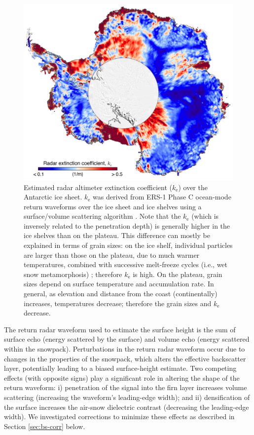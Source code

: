 \begin{figure}[!ht]
  \centering
  \includegraphics[width=.85\textwidth]{img/extinction_coef_v3d.png}
  \caption[Estimated radar altimeter extintion coefficient]{
  Estimated radar altimeter extinction coefficient ($k_\text{e}$) over the Antarctic ice sheet. $k_\text{e}$ was derived from ERS-1 Phase C ocean-mode return waveforms over the ice sheet and ice shelves using a surface/volume scattering algorithm \parencite{Davis1993}. Note that the $k_\text{e}$  (which is inversely related to the penetration depth) is generally higher in the ice shelves than on the plateau. This difference can mostly be explained in terms of grain sizes: on the ice shelf, individual particles are larger than those on the plateau, due to much warmer temperatures, combined with successive melt-freeze cycles (i.e., wet snow metamorphosis) \parencite{Zwally1994}; therefore $k_\text{e}$ is high. On the plateau, grain sizes depend on surface temperature and accumulation rate. In general, as elevation and distance from the coast (continentally) increases, temperatures decrease; therefore the grain sizes and $k_\text{e}$ decrease.
  }
  \label{c2f4}
\end{figure}


The return radar waveform used to estimate the surface height is the sum of surface echo (energy scattered by the surface) and volume echo (energy scattered within the snowpack). Perturbations in the return radar waveform occur due to changes in the properties of the snowpack, which alters the effective backscatter layer, potentially leading to a biased surface-height estimate. Two competing effects (with opposite signs) play a significant role in altering the shape of the return waveform: i) penetration of the signal into the firn layer increases volume scattering (increasing the waveform's leading-edge width); and ii) densification of the surface increases the air-snow dielectric contrast (decreasing the leading-edge width). We investigated corrections to minimize these effects as described in Section \ref{sec:bs-corr} below.


